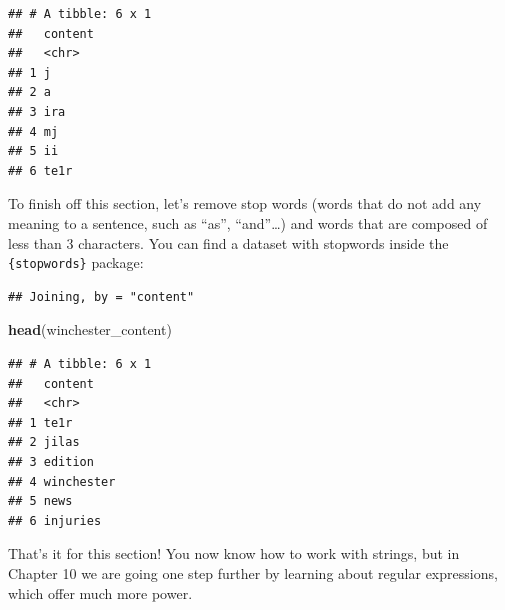 \documentclass[]{gitbook}
\newenvironment{Shaded}{\begin{snugshade}}{\end{snugshade}}
\newcommand{\DecValTok}[1]{\textcolor[rgb]{0.00,0.00,0.81}{#1}}
\newcommand{\KeywordTok}[1]{\textcolor[rgb]{0.13,0.29,0.53}{\textbf{#1}}}
\newcommand{\NormalTok}[1]{#1}
\newcommand{\OperatorTok}[1]{\textcolor[rgb]{0.81,0.36,0.00}{\textbf{#1}}}
\newcommand{\StringTok}[1]{\textcolor[rgb]{0.31,0.60,0.02}{#1}}
\begin{document}
\begin{verbatim}
## # A tibble: 6 x 1
##   content
##   <chr>  
## 1 j      
## 2 a      
## 3 ira    
## 4 mj     
## 5 ii     
## 6 te1r
\end{verbatim}

To finish off this section, let's remove stop words (words that do not add any meaning to a sentence,
such as ``as'', ``and''\ldots{}) and words that are composed of less than 3 characters. You can find a dataset
with stopwords inside the \texttt{\{stopwords\}} package:

\begin{Shaded}
\end{Shaded}

\begin{verbatim}
## Joining, by = "content"
\end{verbatim}

\begin{Shaded}
\begin{Highlighting}[]
\KeywordTok{head}\NormalTok{(winchester_content)}
\end{Highlighting}
\end{Shaded}

\begin{verbatim}
## # A tibble: 6 x 1
##   content   
##   <chr>     
## 1 te1r      
## 2 jilas     
## 3 edition   
## 4 winchester
## 5 news      
## 6 injuries
\end{verbatim}

That's it for this section! You now know how to work with strings, but in Chapter 10 we are going
one step further by learning about regular expressions, which offer much more power.
\end{document}
